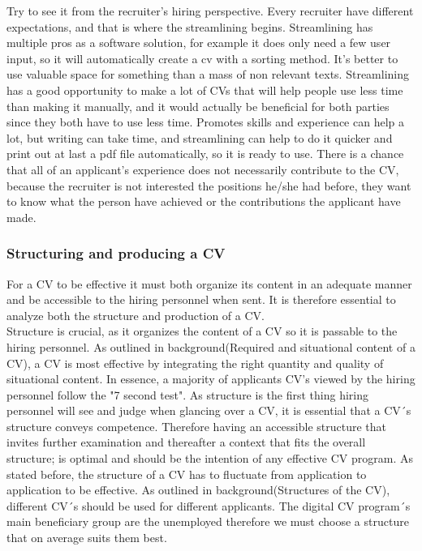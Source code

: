 Try to see it from the recruiter's hiring perspective. Every recruiter have different expectations, 
and that is where the streamlining begins. Streamlining has multiple pros as a software solution,
for example it does only need a few user input, so it will automatically create a cv with a sorting method. 
It's better to use valuable space for something than a mass of non relevant texts.
Streamlining has a good opportunity to make a lot of CVs that will help people use less time than making it manually,
and it would actually be beneficial for both parties since they both have to use less time.
Promotes skills and experience can help a lot, but writing can take time, and streamlining can help to do it quicker 
and print out at last a pdf file automatically, so it is ready to use.
There is a chance that all of an applicant's experience does not necessarily contribute to the CV, 
because the recruiter is not interested the positions he/she had before, they want to know what the person have achieved
or the contributions the applicant have made. 

\subsubsection{Structuring and producing a CV}
For a CV to be effective it must both organize its content in an adequate manner and be accessible to the hiring personnel when sent.
It is therefore essential to analyze both the structure and production of a CV. \\

Structure is crucial, as it organizes the content of a CV so it is passable to the hiring personnel.
As outlined in background(Required and situational content of a CV), a CV is most effective by integrating the right quantity and quality of situational content.
In essence, a majority of applicants CV's viewed by the hiring personnel follow the "7 second test".
As structure is the first thing hiring personnel will see and judge when glancing over a CV, it is essential that a CV´s structure conveys competence.
Therefore having an accessible structure that invites further examination and thereafter a context that fits the overall structure;
is optimal and should be the intention of any effective CV program.
As stated before, the structure of a CV has to fluctuate from application to application to be effective.
As outlined in background(Structures of the CV), different CV´s should be used for different applicants.
The digital CV program´s main beneficiary group are the unemployed therefore we must choose a structure that on average suits them best.

